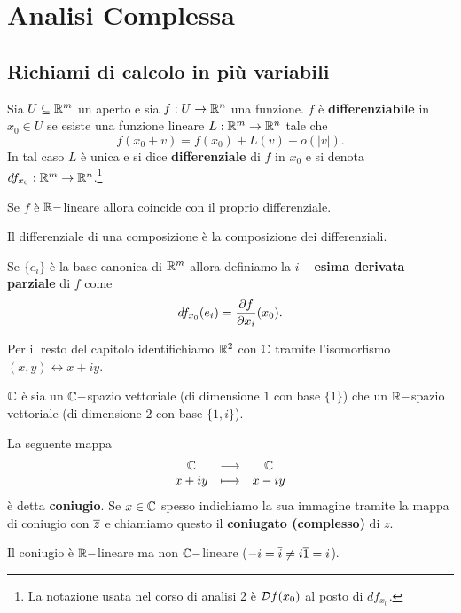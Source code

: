 \chapter{Analisi Complessa}

\begin{multicols*}{2}


\section{Richiami di calcolo in pi\`u variabili}
\begin{definition}
Sia $U\subseteq \R^m$ un aperto e sia $f:U\to \R^n$ una funzione. $f$ \`e  \textbf{differenziabile} in $x_0\in U$ se esiste una funzione lineare $L:\R^m\to \R^n$ tale che
\[f(x_0+v)=f(x_0)+L(v)+o(|v|).\]
In tal caso $L$ \`e unica e si dice \textbf{differenziale} di $f$ in $x_0$ e si denota $df_{x_0}:\R^m\to \R^n$.\footnote{La notazione usata nel corso di analisi 2 \`e $\Dc f(x_0)$ al posto di $df_{x_0}$.}
\end{definition}
\begin{remark}
Se $f$ \`e $\R-$lineare allora coincide con il proprio differenziale.
\end{remark}
\begin{remark}
Il differenziale di una composizione \`e la composizione dei differenziali.
\end{remark}
\begin{definition}
Se $\{e_i\}$ \`e la base canonica di $\R^m$ allora definiamo la \textbf{$i-$esima derivata parziale} di $f$ come
\[df_{x_0}(e_i)=\pdpi if(x_0).\]
\end{definition}

\noindent
Per il resto del capitolo identifichiamo $\R^2$ con $\C$ tramite l'isomorfismo $(x,y)\leftrightarrow x+iy$.

\begin{remark}
$\C$ \`e sia un $\C-$spazio vettoriale (di dimensione $1$ con base $\{1\}$) che un $\R-$spazio vettoriale (di dimensione $2$ con base $\{1,i\}$).
\end{remark}

\begin{definition}[Coniugio]
La seguente mappa
\[\funcDef\C\C {x+iy}{x-iy}\]
\`e detta \textbf{coniugio}. Se $x\in \C$ spesso indichiamo la sua immagine tramite la mappa di coniugio con $\ol z$ e chiamiamo questo il \textbf{coniugato (complesso)} di $z$.
\end{definition}
\begin{remark}
Il coniugio \`e $\R-$lineare ma non $\C-$lineare ($-i=\ol{i}\neq i\ol{1}=i$).
\end{remark}


\end{multicols*}
